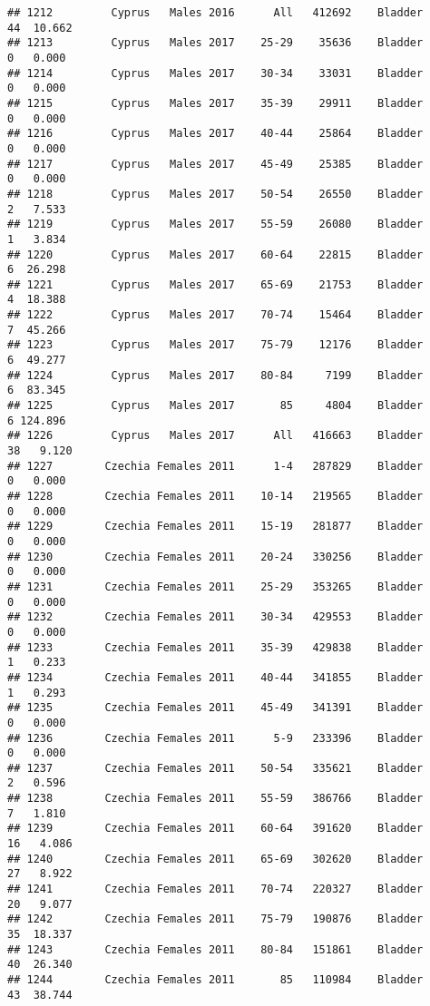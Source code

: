 \documentclass[
]{article}
\begin{document}
\begin{verbatim}
## 1212         Cyprus   Males 2016      All   412692    Bladder     44  10.662
## 1213         Cyprus   Males 2017    25-29    35636    Bladder      0   0.000
## 1214         Cyprus   Males 2017    30-34    33031    Bladder      0   0.000
## 1215         Cyprus   Males 2017    35-39    29911    Bladder      0   0.000
## 1216         Cyprus   Males 2017    40-44    25864    Bladder      0   0.000
## 1217         Cyprus   Males 2017    45-49    25385    Bladder      0   0.000
## 1218         Cyprus   Males 2017    50-54    26550    Bladder      2   7.533
## 1219         Cyprus   Males 2017    55-59    26080    Bladder      1   3.834
## 1220         Cyprus   Males 2017    60-64    22815    Bladder      6  26.298
## 1221         Cyprus   Males 2017    65-69    21753    Bladder      4  18.388
## 1222         Cyprus   Males 2017    70-74    15464    Bladder      7  45.266
## 1223         Cyprus   Males 2017    75-79    12176    Bladder      6  49.277
## 1224         Cyprus   Males 2017    80-84     7199    Bladder      6  83.345
## 1225         Cyprus   Males 2017       85     4804    Bladder      6 124.896
## 1226         Cyprus   Males 2017      All   416663    Bladder     38   9.120
## 1227        Czechia Females 2011      1-4   287829    Bladder      0   0.000
## 1228        Czechia Females 2011    10-14   219565    Bladder      0   0.000
## 1229        Czechia Females 2011    15-19   281877    Bladder      0   0.000
## 1230        Czechia Females 2011    20-24   330256    Bladder      0   0.000
## 1231        Czechia Females 2011    25-29   353265    Bladder      0   0.000
## 1232        Czechia Females 2011    30-34   429553    Bladder      0   0.000
## 1233        Czechia Females 2011    35-39   429838    Bladder      1   0.233
## 1234        Czechia Females 2011    40-44   341855    Bladder      1   0.293
## 1235        Czechia Females 2011    45-49   341391    Bladder      0   0.000
## 1236        Czechia Females 2011      5-9   233396    Bladder      0   0.000
## 1237        Czechia Females 2011    50-54   335621    Bladder      2   0.596
## 1238        Czechia Females 2011    55-59   386766    Bladder      7   1.810
## 1239        Czechia Females 2011    60-64   391620    Bladder     16   4.086
## 1240        Czechia Females 2011    65-69   302620    Bladder     27   8.922
## 1241        Czechia Females 2011    70-74   220327    Bladder     20   9.077
## 1242        Czechia Females 2011    75-79   190876    Bladder     35  18.337
## 1243        Czechia Females 2011    80-84   151861    Bladder     40  26.340
## 1244        Czechia Females 2011       85   110984    Bladder     43  38.744

\end{verbatim}
\end{document}
